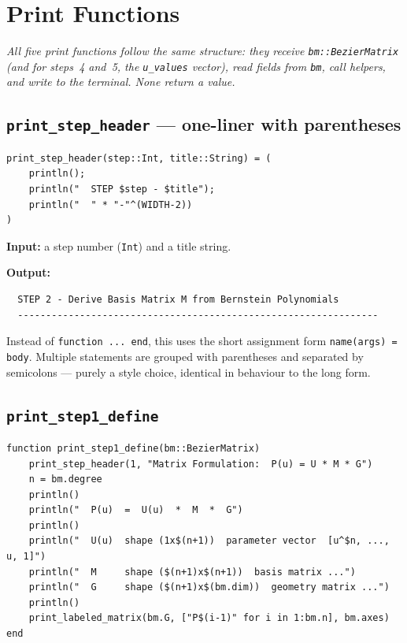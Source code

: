 \documentclass[12pt, a4paper]{article}
\newcommand{\cd}[1]{\texttt{#1}}
\begin{document}
\section{Print Functions}

\textit{All five print functions follow the same structure:
they receive \cd{bm::BezierMatrix} (and for steps~4 and~5,
the \cd{u\_values} vector), read fields from \cd{bm},
call helpers, and write to the terminal.
None return a value.}

\subsection{\texttt{print\_step\_header} --- one-liner with parentheses}

\begin{verbatim}
print_step_header(step::Int, title::String) = (
    println();
    println("  STEP $step - $title");
    println("  " * "-"^(WIDTH-2))
)
\end{verbatim}

\textbf{Input:} a step number (\cd{Int}) and a title string.

\textbf{Output:}
\begin{verbatim}
  STEP 2 - Derive Basis Matrix M from Bernstein Polynomials
  ----------------------------------------------------------------
\end{verbatim}

Instead of \cd{function ... end}, this uses the short
assignment form \cd{name(args) = body}.
Multiple statements are grouped with parentheses and
separated by semicolons --- purely a style choice,
identical in behaviour to the long form.

\subsection{\texttt{print\_step1\_define}}

\begin{verbatim}
function print_step1_define(bm::BezierMatrix)
    print_step_header(1, "Matrix Formulation:  P(u) = U * M * G")
    n = bm.degree
    println()
    println("  P(u)  =  U(u)  *  M  *  G")
    println()
    println("  U(u)  shape (1x$(n+1))  parameter vector  [u^$n, ..., u, 1]")
    println("  M     shape ($(n+1)x$(n+1))  basis matrix ...")
    println("  G     shape ($(n+1)x$(bm.dim))  geometry matrix ...")
    println()
    print_labeled_matrix(bm.G, ["P$(i-1)" for i in 1:bm.n], bm.axes)
end
\end{verbatim}
\end{document}
